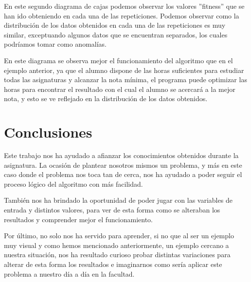 \documentclass[11pt, a4paper, titlepage]{article}
\begin{document}
\vspace{5mm}

En este segundo diagrama de cajas podemos observar los valores ''fitness'' que se han ido obteniendo en cada una de las repeticiones. Podemos observar como la distribución de los datos obtenidos en cada una de las repeticiones es muy similar, exceptuando algunos datos que se encuentran separados, los cuales podríamos tomar como anomalías.

\vspace{5mm}

En este diagrama se observa mejor el funcionamiento del algoritmo que en el ejemplo anterior, ya que el alumno dispone de las horas suficientes para estudiar todas las asignaturas y alcanzar la nota mínima, el programa puede optimizar las horas para encontrar el resultado con el cual el alumno se acercará a la mejor nota, y esto se ve reflejado en la distribución de los datos obtenidos.

\newpage

\section{Conclusiones}
Este trabajo nos ha ayudado a afianzar los conocimientos obtenidos durante la asignatura. La ocasión de plantear nosotros mismos un problema, y más en este caso donde el problema nos toca tan de cerca, nos ha ayudado a poder seguir el proceso lógico del algoritmo con más facilidad.

\vspace{5mm}

También nos ha brindado la oportunidad de poder jugar con las variables de entrada y distintos valores, para ver de esta forma como se alteraban los resultados y comprender mejor el funcionamiento.

\vspace{5mm}

Por último, no solo nos ha servido para aprender, si no que al ser un ejemplo muy visual y como hemos mencionado anteriormente, un ejemplo cercano a nuestra situación, nos ha resultado curioso probar distintas variaciones para alterar de esta forma los resultados e imaginarnos como sería aplicar este problema a nuestro día a día en la facultad.
\end{document}
